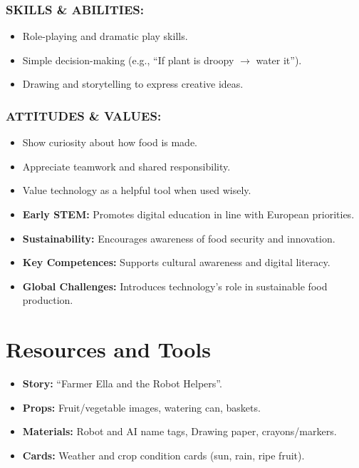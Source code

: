 \documentclass[11pt, a4paper]{article}
\begin{document}
\subsubsection*{SKILLS \& ABILITIES:}
\begin{itemize}
    \item Role-playing and dramatic play skills.
    \item Simple decision-making (e.g., ``If plant is droopy $\to$ water it'').
    \item Drawing and storytelling to express creative ideas.
\end{itemize}

\subsubsection*{ATTITUDES \& VALUES:}
\begin{itemize}
    \item Show curiosity about how food is made.
    \item Appreciate teamwork and shared responsibility.
    \item Value technology as a helpful tool when used wisely.
\end{itemize}

\begin{eurobox}
\begin{itemize}
    \item \textbf{Early STEM:} Promotes digital education in line with European priorities.
    \item \textbf{Sustainability:} Encourages awareness of food security and innovation.
    \item \textbf{Key Competences:} Supports cultural awareness and digital literacy.
    \item \textbf{Global Challenges:} Introduces technology's role in sustainable food production.
\end{itemize}
\end{eurobox}

\newpage
\section{Resources and Tools}
\begin{itemize}
    \item \textbf{Story:} ``Farmer Ella and the Robot Helpers''.
    \item \textbf{Props:} Fruit/vegetable images, watering can, baskets.
    \item \textbf{Materials:} Robot and AI name tags, Drawing paper, crayons/markers.
    \item \textbf{Cards:} Weather and crop condition cards (sun, rain, ripe fruit).
\end{itemize}
\end{document}
